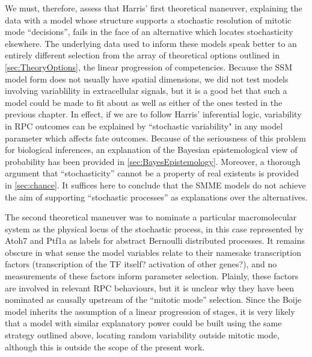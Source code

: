 We must, therefore, assess that Harris' first theoretical maneuver, explaining the data with a model whose structure supports a stochastic resolution of mitotic mode ``decisions'', fails in the face of an alternative which locates stochasticity elsewhere. The underlying data used to inform these models speak better to an entirely different selection from the array of theoretical options outlined in \autoref{sec:TheoryOptions}, the linear progression of competencies. Because the SSM model form does not usually have spatial dimensions, we did not test models involving variablility in extracellular signals, but it is a good bet that such a model could be made to fit about as well as either of the ones tested in the previous chapter. In effect, if we are to follow Harris' inferential logic, variability in RPC outcomes can be explained by ``stochastic variability" in any model parameter which affects fate outcomes. Because of the seriousness of this problem for biological inferences, an explanation of the Bayesian epistemological view of probability has been provided in \autoref{sec:BayesEpistemology}. Moreover, a thorough argument that ``stochasticity'' cannot be a property of real existents is provided in \autoref{sec:chance}. It suffices here to conclude that the SMME models do not achieve the aim of supporting ``stochastic processes'' as explanations over the alternatives.

The second theoretical maneuver was to nominate a particular macromolecular system as the physical locus of the stochastic process, in this case represented by Atoh7 and Ptf1a as labels for abstract Bernoulli distributed processes. It remains obscure in what sense the model variables relate to their namesake transcription factors (transcription of the TF itself? activation of other genes?), and no measurements of these factors inform parameter selection. Plainly, these factors are involved in relevant RPC behaviours, but it is unclear why they have been nominated as causally upstream of the ``mitotic mode'' selection. Since the Boije model inherits the assumption of a linear progression of stages, it is very likely that a model with similar explanatory power could be built using the same strategy outlined above, locating random variability outside mitotic mode, although this is outside the scope of the present work.

